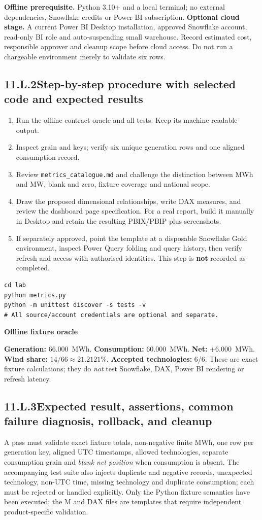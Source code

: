 \documentclass[11pt,twoside]{article}
\newcommand{\topic}[2]{\subsection*{#1\quad #2}}
\begin{document}
\textbf{Offline prerequisite.} Python 3.10+ and a local terminal; no external dependencies, Snowflake credits or Power BI subscription. \textbf{Optional cloud stage.} A current Power BI Desktop installation, approved Snowflake account, read-only BI role and auto-suspending small warehouse. Record estimated cost, responsible approver and cleanup scope before cloud access. Do not run a chargeable environment merely to validate six rows.
\topic{11.L.2}{Step-by-step procedure with selected code and expected results}
\begin{enumerate}
\item Run the offline contract oracle and all tests. Keep its machine-readable output.
\item Inspect grain and keys; verify six unique generation rows and one aligned consumption record.
\item Review \texttt{metrics\_catalogue.md} and challenge the distinction between MWh and MW, blank and zero, fixture coverage and national scope.
\item Draw the proposed dimensional relationships, write DAX measures, and review the dashboard page specification. For a real report, build it manually in Desktop and retain the resulting PBIX/PBIP plus screenshots.
\item If separately approved, point the template at a disposable Snowflake Gold environment, inspect Power Query folding and query history, then verify refresh and access with authorised identities. This step is \textbf{not} recorded as completed.
\end{enumerate}
\begin{lstlisting}[caption={Zero-cloud command sequence from the companion lab.}]
cd lab
python metrics.py
python -m unittest discover -s tests -v
# All source/account credentials are optional and separate.
\end{lstlisting}
\begin{whitebox}\textbf{Offline fixture oracle}\par
\textbf{Generation:} 66.000~MWh. \textbf{Consumption:} 60.000~MWh. \textbf{Net:} +6.000~MWh. \textbf{Wind share:} $14/66\approx21.2121\%$. \textbf{Accepted technologies:} 6/6. These are exact fixture calculations; they do \emph{not} test Snowflake, DAX, Power BI rendering or refresh latency.\end{whitebox}
\newpage
\topic{11.L.3}{Expected result, assertions, common failure diagnosis, rollback, and cleanup}
A pass must validate exact fixture totals, non-negative finite MWh, one row per generation key, aligned UTC timestamps, allowed technologies, separate consumption grain and \emph{blank net position} when consumption is absent. The accompanying test suite also injects duplicate and negative records, unexpected technology, non-UTC time, missing technology and duplicate consumption; each must be rejected or handled explicitly. Only the Python fixture semantics have been executed; the M and DAX files are templates that require independent product-specific validation.
\end{document}

